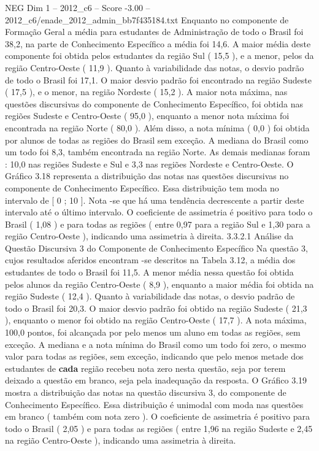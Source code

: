 \begin{textsample}{NEG Dim 1 – 2012\_c6 – Score -3.00 – 2012\_c6/enade\_2012\_admin\_bb7f435184.txt}
Enquanto no componente de Formação Geral a média para estudantes de Administração de todo o Brasil foi 38,2, na parte de Conhecimento Específico a média foi 14,6.
A maior média deste componente foi obtida pelos estudantes da região Sul ( 15,5 ), e a menor, pelos da região Centro-Oeste ( 11,9 ).
Quanto à variabilidade das notas, o desvio padrão de todo o Brasil foi 17,1.
O maior desvio padrão foi encontrado na região Sudeste ( 17,5 ), e o menor, na região Nordeste ( 15,2 ).
A maior nota máxima, nas questões discursivas do componente de Conhecimento Específico, foi obtida nas regiões Sudeste e Centro-Oeste ( 95,0 ), enquanto a menor nota máxima foi encontrada na região Norte ( 80,0 ).
Além disso, a nota mínima ( 0,0 ) foi obtida por alunos de todas as regiões do Brasil sem exceção.
A mediana do Brasil como um todo foi 8,3, também encontrada na região Norte.
As demais medianas foram : 10,0 nas regiões Sudeste e Sul e 3,3 nas regiões Nordeste e Centro-Oeste.
O Gráfico 3.18 representa a distribuição das notas nas questões discursivas no componente de Conhecimento Específico.
Essa distribuição tem moda no intervalo de [ 0 ; 10 ].
Nota -se que há uma tendência decrescente a partir deste intervalo até o último intervalo.
O coeficiente de assimetria é positivo para todo o Brasil ( 1,08 ) e para todas as regiões ( entre 0,97 para a região Sul e 1,30 para a região Centro-Oeste ), indicando uma assimetria à direita. 3.3.2.1 Análise da Questão Discursiva 3 do Componente de Conhecimento Específico Na questão 3, cujos resultados aferidos encontram -se descritos na Tabela 3.12, a média dos estudantes de todo o Brasil foi 11,5.
A menor média nessa questão foi obtida pelos alunos da região Centro-Oeste ( 8,9 ), enquanto a maior média foi obtida na região Sudeste ( 12,4 ).
Quanto à variabilidade das notas, o desvio padrão de todo o Brasil foi 20,3.
O maior desvio padrão foi obtido na região Sudeste ( 21,3 ), enquanto o menor foi obtido na região Centro-Oeste ( 17,7 ).
A nota máxima, 100,0 pontos, foi alcançada por pelo menos um aluno em todas as regiões, sem exceção.
A mediana e a nota mínima do Brasil como um todo foi zero, o mesmo valor para todas as regiões, sem exceção, indicando que pelo menos metade dos estudantes de \textbf{cada} região recebeu nota zero nesta questão, seja por terem deixado a questão em branco, seja pela inadequação da resposta.
O Gráfico 3.19 mostra a distribuição das notas na questão discursiva 3, do componente de Conhecimento Específico.
Essa distribuição é unimodal com moda nas questões em branco ( também com nota zero ).
O coeficiente de assimetria é positivo para todo o Brasil ( 2,05 ) e para todas as regiões ( entre 1,96 na região Sudeste e 2,45 na região Centro-Oeste ), indicando uma assimetria à direita.

\end{textsample}
